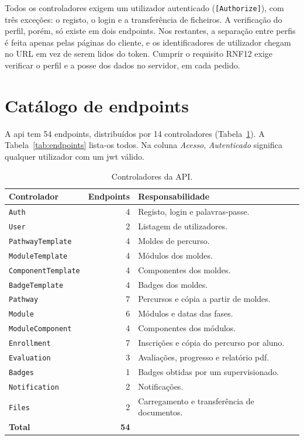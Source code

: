 Todos os controladores exigem um utilizador autenticado (\texttt{[Authorize]}), com três exceções: o registo, o login e a transferência de ficheiros. A verificação do perfil, porém, só existe em dois endpoints. Nos restantes, a separação entre perfis é feita apenas pelas páginas do cliente, e os identificadores de utilizador chegam no URL em vez de serem lidos do token. Cumprir o requisito RNF12 exige verificar o perfil e a posse dos dados no servidor, em cada pedido.

\section{Catálogo de endpoints}
\label{sec:endpoints}

A \gls{api} tem 54 endpoints, distribuídos por 14 controladores (Tabela~\ref{tab:controladores}). A Tabela~\ref{tab:endpoints} lista-os todos. Na coluna \emph{Acesso}, \emph{Autenticado} significa qualquer utilizador com um \gls{jwt} válido.

\begin{table}[H]
    \centering
    \small
    \begin{tabularx}{\linewidth}{lrX}
        \toprule
        \textbf{Controlador} & \textbf{Endpoints} & \textbf{Responsabilidade} \\
        \midrule
        \texttt{Auth} & 4 & Registo, login e palavras-passe. \\
        \texttt{User} & 2 & Listagem de utilizadores. \\
        \texttt{PathwayTemplate} & 4 & Moldes de percurso. \\
        \texttt{ModuleTemplate} & 4 & Módulos dos moldes. \\
        \texttt{ComponentTemplate} & 4 & Componentes dos moldes. \\
        \texttt{BadgeTemplate} & 4 & Badges dos moldes. \\
        \texttt{Pathway} & 7 & Percursos e cópia a partir de moldes. \\
        \texttt{Module} & 6 & Módulos e datas das fases. \\
        \texttt{ModuleComponent} & 4 & Componentes dos módulos. \\
        \texttt{Enrollment} & 7 & Inscrições e cópia do percurso por aluno. \\
        \texttt{Evaluation} & 3 & Avaliações, progresso e relatório \gls{pdf}. \\
        \texttt{Badges} & 1 & Badges obtidas por um supervisionado. \\
        \texttt{Notification} & 2 & Notificações. \\
        \texttt{Files} & 2 & Carregamento e transferência de documentos. \\
        \midrule
        \textbf{Total} & \textbf{54} & \\
        \bottomrule
    \end{tabularx}
    \caption{Controladores da API.}
    \label{tab:controladores}
\end{table}

